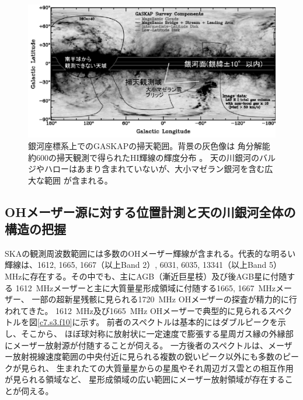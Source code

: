 \begin{figure}[t]
\begin{center}
\includegraphics[width=1.0\linewidth]{astrometry/GASKAP_field.eps}
\end{center}
\vspace{-7mm}
\caption{銀河座標系上でのGASKAPの掃天範囲\citep{2013PASA...30....3D}。背景の灰色像は
角分解能約600\arcsec の掃天観測で得られたHI輝線の輝度分布 \citep{2010A&A...521A..17K}。
天の川銀河のバルジやハローはあまり含まれていないが、大小マゼラン銀河を含む広大な範囲
が含まれる。}\label{c7.s4.f12}
\end{figure}

\setcounter{subsection}{2}\subsection{OHメーザー源に対する位置計測と天の川銀河全体の構造の把握}\label{c7.s3.ss3}
SKAの観測周波数範囲には多数のOHメーザー輝線が含まれる。代表的な明るい輝線は、1612, 1665, 1667（以上Band 2）, 
6031, 6035, 13341（以上Band 5） MHzに存在する。その中でも、主にAGB（漸近巨星枝）及び後AGB星に付随する
1612~MHzメーザーと主に大質量星形成領域に付随する1665, 1667~MHzメーザー、
一部の超新星残骸に見られる1720~MHz OHメーザーの探査が精力的に行われてきた。
1612~MHz及び1665~MHz OHメーザーで典型的に見られるスペクトルを図\ref{c7.s3.f10}に示す。
前者のスペクトルは基本的にはダブルピークを示し、そこから、
ほぼ球対称に放射状に一定速度で膨張する星周ガス縁の外縁部にメーザー放射源が付随することが伺える。
一方後者のスペクトルは、メーザー放射視線速度範囲の中央付近に見られる複数の鋭いピーク以外にも多数のピークが見られ、
生まれたての大質量星からの星風やそれ周辺ガス雲との相互作用が見られる領域など、
星形成領域の広い範囲にメーザー放射領域が存在することが伺える。

